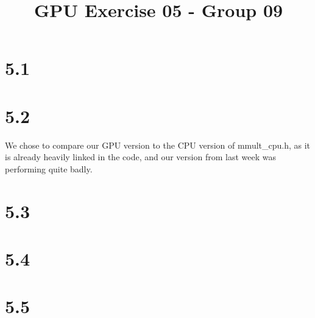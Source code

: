 \documentclass{report}
\begin{document}
\title{GPU Exercise 05 - Group 09}
\maketitle

\section*{5.1}

\section*{5.2}
 We chose to compare our GPU version to the CPU version of mmult_cpu.h, as it is already heavily linked in the code, and our version from last week was performing quite badly.
  
\section*{5.3}

\section*{5.4}

\section*{5.5}
\end{document}
